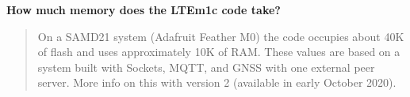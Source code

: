 {\bfseries{How much memory does the L\+T\+Em1c code take?}} \begin{quote}
On a S\+A\+M\+D21 system (Adafruit Feather M0) the code occupies about 40K of flash and uses approximately 10K of R\+AM. These values are based on a system built with Sockets, M\+Q\+TT, and G\+N\+SS with one external peer server. More info on this with version 2 (available in early October 2020). \end{quote}
